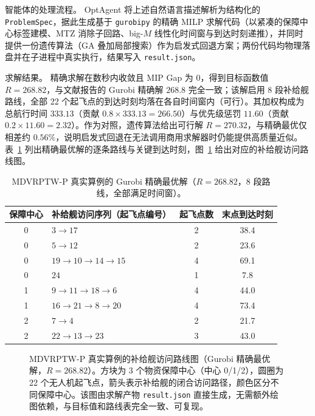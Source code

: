 \documentclass[11pt]{article}
\begin{document}
智能体的处理流程。 OptAgent 将上述自然语言描述解析为结构化的 \texttt{ProblemSpec}，据此生成基于 \texttt{gurobipy} 的精确 MILP 求解代码（以紧凑的保障中心标签建模、MTZ 消除子回路、big-$M$ 线性化时间窗与到达时刻递推），并同时提供一份遗传算法（GA 叠加局部搜索）作为启发式回退方案；两份代码均物理落盘并在子进程中真实执行，结果写入 \texttt{result.json}。

求解结果。 精确求解在数秒内收敛且 MIP Gap 为 $0$，得到目标函数值 $R=268.82$，与文献报告的 Gurobi 精确解 $268.8$ 完全一致；该解启用 8 段补给舰路线，全部 22 个起飞点的到达时刻均落在各自时间窗内（可行）。其加权构成为总航行时间 $333.13$（贡献 $0.8\times333.13=266.50$）与优先级惩罚 $11.60$（贡献 $0.2\times11.60=2.32$）。作为对照，遗传算法给出可行解 $R=270.32$，与精确最优仅相差约 $0.56\%$，说明启发式回退在无法调用商用求解器时仍能提供高质量近似。表~\ref{tab:mdvrptw-routes} 列出精确最优解的逐条路线与关键到达时刻，图~\ref{fig:mdvrptw-route} 给出对应的补给舰访问路线图。

\begin{table}[t]
\centering
\caption{MDVRPTW-P 真实算例的 Gurobi 精确最优解（$R=268.82$，8 段路线，全部满足时间窗）。}
\label{tab:mdvrptw-routes}
\small
\renewcommand{\arraystretch}{1.15}
\begin{tabular}{clcc}
\toprule
保障中心 & 补给舰访问序列（起飞点编号） & 起飞点数 & 末点到达时刻 \\
\midrule
0 & $3 \rightarrow 17$ & 2 & 38.4 \\
0 & $5 \rightarrow 12$ & 2 & 23.6 \\
0 & $19 \rightarrow 10 \rightarrow 14 \rightarrow 15$ & 4 & 69.1 \\
0 & $24$ & 1 & 7.8 \\
1 & $9 \rightarrow 11 \rightarrow 18 \rightarrow 6$ & 4 & 44.0 \\
1 & $16 \rightarrow 21 \rightarrow 8 \rightarrow 20$ & 4 & 73.4 \\
2 & $7 \rightarrow 4$ & 2 & 21.7 \\
2 & $22 \rightarrow 13 \rightarrow 23$ & 3 & 43.0 \\
\bottomrule
\end{tabular}
\end{table}

\begin{figure}[t]
\centering
\resizebox{0.86\linewidth}{!}{%
}
\caption{MDVRPTW-P 真实算例的补给舰访问路线图（Gurobi 精确最优解，$R=268.82$）。方块为 3 个物资保障中心（中心 0/1/2），圆圈为 22 个无人机起飞点，箭头表示补给舰的闭合访问路径，颜色区分不同保障中心。该图由求解产物 \texttt{result.json} 直接生成，无需额外绘图依赖，与目标值和路线表完全一致、可复现。}
\label{fig:mdvrptw-route}
\end{figure}
\end{document}
